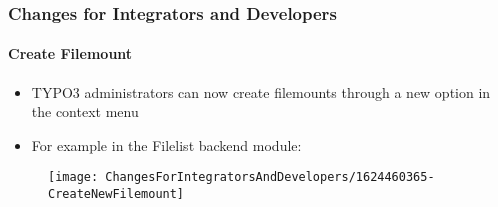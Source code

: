 %

\begin{frame}[fragile]
	\frametitle{Changes for Integrators and Developers}
	\framesubtitle{Create Filemount}


	\begin{itemize}
		\item TYPO3 administrators can now create filemounts through a new
			option in the context menu
		\item For example in the Filelist backend module:
	\end{itemize}

	\begin{figure}
		\texttt{[image: ChangesForIntegratorsAndDevelopers/1624460365-CreateNewFilemount]}
	\end{figure}

\end{frame}

